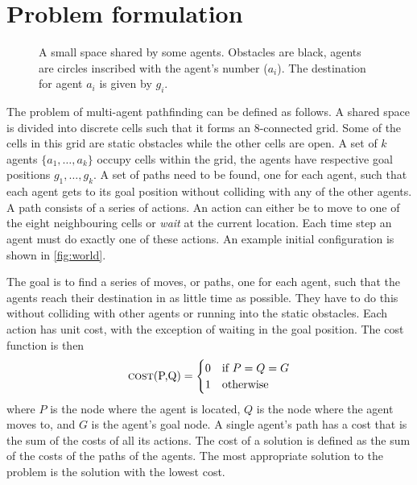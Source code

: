 \section{Problem formulation}\label{sec:problem}

\begin{figure}[t]
    \centering
    \def\svgscale{.7}
    
    \caption{A small space shared by some agents. Obstacles are black, agents
        are circles inscribed with the agent's number ($a_i$). The destination
        for agent $a_i$ is given by $g_i$.}
    \label{fig:world}
\end{figure}

The problem of multi-agent pathfinding can be defined as follows. A shared
space is divided into discrete cells such that it forms an 8-connected grid.
Some of the cells in this grid are static obstacles while the other cells are
open. A set of $k$ agents $\{a_1, \ldots, a_k\}$ occupy cells within the grid,
the agents have respective goal positions $g_1, \ldots, g_k$. A set of paths
need to be found, one for each agent, such that each agent gets to its goal
position without colliding with any of the other agents. A path consists of a
series of actions. An action can either be to move to one of the eight
neighbouring cells or \emph{wait} at the current location. Each time step an
agent must do exactly one of these actions. An example initial configuration is
shown in \autoref{fig:world}.

The goal is to find a series of moves, or paths, one for each agent, such that
the agents reach their destination in as little time as possible. They have to
do this without colliding with other agents or running into the static
obstacles. Each action has unit cost, with the exception of waiting in the goal
position. The cost function is then
\[
\text{\textsc{cost}(P,Q)} =
\begin{cases}
    0 & \text{if } P = Q = G \\
    1 & \text{otherwise}
\end{cases}
\]
where $P$ is the node where the agent is located, $Q$ is the node where the
agent moves to, and $G$ is the agent's goal node. A single agent's path has a
cost that is the sum of the costs of all its actions. The cost of a solution is
defined as the sum of the costs of the paths of the agents. The most
appropriate solution to the problem is the solution with the lowest cost.

